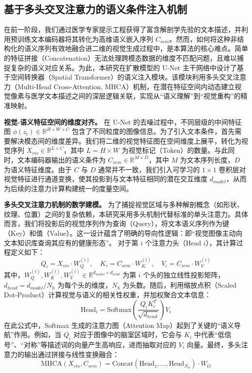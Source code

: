 \documentclass[Win]{xjtuBSThesis}  %
\begin{document}
\subsection{基于多头交叉注意力的语义条件注入机制}
\label{subsec:cross_attention}

在前一阶段，我们通过医学专家提示工程获得了富含解剖学先验的文本描述，并利用预训练文本编码器将其转化为高维语义嵌入序列 $C_{sem}$。然而，如何将这种非结构化的语义序列有效地融合进二维的视觉生成过程中，是本算法的核心难点。简单的特征拼接（Concatenation）无法处理跨模态数据的维度不匹配问题，且难以捕捉复杂的语义对应关系。为此，本研究在扩散模型的 U-Net 主干网络中设计了基于空间转换器（Spatial Transformer）的语义注入模块。该模块利用多头交叉注意力（Multi-Head Cross-Attention, MHCA）机制，在潜在特征空间内动态建立视觉像素与医学文本描述之间的深层逻辑关联，实现从“语义理解”到“视觉重构”的精准映射。

\textbf{视觉-语义特征空间的维度对齐。} 
在 U-Net 的去噪过程中，不同层级的中间特征图 $\phi(z_t) \in \mathbb{R}^{H \times W \times C}$ 包含了不同粒度的图像信息。为了引入文本条件，首先需要解决模态间的维度差异。我们将二维的视觉特征图在空间维度上展平，转化为视觉序列 $X_{vis} \in \mathbb{R}^{L \times C}$，其中 $L = H \times W$ 为视觉标记（Token）的数量。与此同时，文本编码器输出的语义条件为 $C_{sem} \in \mathbb{R}^{M \times D}$，其中 $M$ 为文本序列长度，$D$ 为语义特征维度。由于 $C$ 与 $D$ 通常并不一致，我们引入可学习的 $1 \times 1$ 卷积层对视觉特征进行通道变换，使其投影到与文本特征相同的潜在交互维度 $d_{model}$，从而为后续的注意力计算构建统一的度量空间。

\textbf{多头交叉注意力机制的数学建模。} 
为了捕捉视觉区域与多种解剖概念（如形状、纹理、位置）之间的复杂依赖，本研究采用多头机制代替标准的单头注意力。具体而言，我们将投影后的视觉序列作为查询（Query），将文本语义序列作为键（Key）和值（Value）。这一设计蕴含了明确的导向性逻辑：即“视觉图像主动向文本知识库查询其应有的健康形态”。
对于第 $i$ 个注意力头（Head $i$），其计算过程定义如下：
\begin{equation}
    Q_i = X_{vis} \cdot W_Q^{(i)}, \quad K_i = C_{sem} \cdot W_K^{(i)}, \quad V_i = C_{sem} \cdot W_V^{(i)}
\end{equation}
其中，$W_Q^{(i)}, W_K^{(i)}, W_V^{(i)} \in \mathbb{R}^{d_{model} \times d_{head}}$ 为第 $i$ 个头的独立线性投影矩阵，$d_{head} = d_{model} / N_h$ 为每个头的维度，$N_h$ 为头数。随后，利用缩放点积（Scaled Dot-Product）计算视觉与语义的相关性权重，并加权聚合文本信息：
\begin{equation}
    \text{Head}_i = \text{Softmax}\left( \frac{Q_i K_i^T}{\sqrt{d_{head}}} \right) V_i
\end{equation}
在此公式中，Softmax 生成的注意力图（Attention Map）起到了关键的“语义导航”作用。例如，当 $Q_i$ 对应于图像中的脑室区域时，它会与 $K_i$ 中代表“低信号”、“对称”等描述词的向量产生高响应，进而抽取对应的 $V_i$ 向量。最终，多头注意力的输出通过拼接与线性变换融合：
\begin{equation}
    \text{MHCA}(X_{vis}, C_{sem}) = \text{Concat}(\text{Head}_1, \dots, \text{Head}_{N_h}) \cdot W_O
\end{equation}
\end{document}
